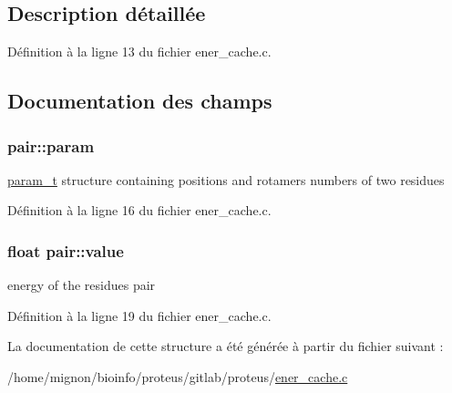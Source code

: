 \subsection{Description détaillée}


Définition à la ligne 13 du fichier ener\+\_\+cache.\+c.



\subsection{Documentation des champs}
\hypertarget{structpair_aacb6fff534dbfa71fe91d5bb6afc6198}{
\subsubsection[{param}]{ pair\+::param}}\label{structpair_aacb6fff534dbfa71fe91d5bb6afc6198}


\hyperlink{structparam__t}{param\+\_\+t} structure containing positions and rotamers numbers of two residues 



Définition à la ligne 16 du fichier ener\+\_\+cache.\+c.

\hypertarget{structpair_af0206edb649caff28c1cbc4c194e158d}{
\subsubsection[{value}]{\setlength{\rightskip}{0pt plus 5cm}float pair\+::value}}\label{structpair_af0206edb649caff28c1cbc4c194e158d}


energy of the residues pair 



Définition à la ligne 19 du fichier ener\+\_\+cache.\+c.



La documentation de cette structure a été générée à partir du fichier suivant \+:\begin{DoxyCompactItemize}
\item 
/home/mignon/bioinfo/proteus/gitlab/proteus/\hyperlink{ener__cache_8c}{ener\+\_\+cache.\+c}\end{DoxyCompactItemize}
